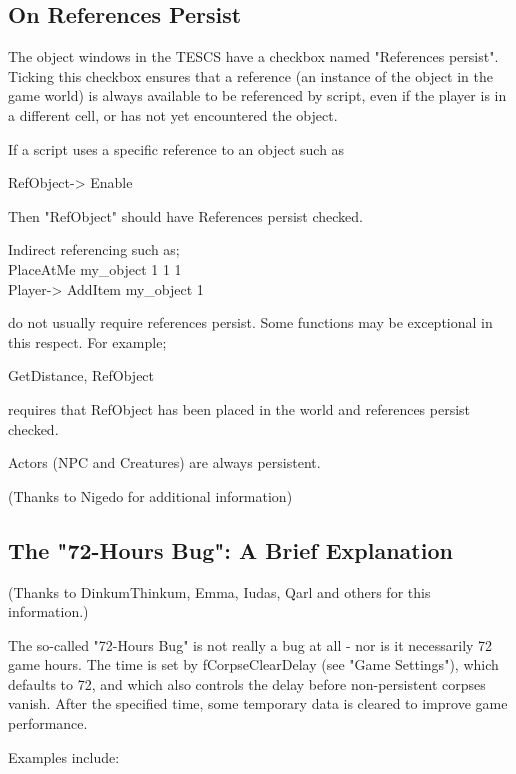 \hypertarget{on-references-persist}{%
\subsection{\texorpdfstring{\hfill\break
On References
Persist}{ On References Persist}}\label{on-references-persist}}

The object windows in the TESCS have a checkbox named "References
persist". Ticking this checkbox ensures that a reference (an instance of
the object in the game world) is always available to be referenced by
script, even if the player is in a different cell, or has not yet
encountered the object.

If a script uses a specific reference to an object such as

RefObject-> Enable

Then "RefObject" should have References persist checked.

Indirect referencing such as;\\
PlaceAtMe my\_object 1 1 1\\
Player-> AddItem my\_object 1

do not usually require references persist. Some functions may be
exceptional in this respect. For example;

GetDistance, RefObject

requires that RefObject has been placed in the world and references
persist checked.

Actors (NPC and Creatures) are always persistent.

(Thanks to Nigedo for additional information)

\hypertarget{the-72-hours-bug-a-brief-explanation}{%
\subsection{The "72-Hours Bug": A Brief
Explanation}\label{the-72-hours-bug-a-brief-explanation}}

(Thanks to DinkumThinkum, Emma, Iudas, Qarl and others for this
information.)

The so-called "72-Hours Bug" is not really a bug at all - nor is it
necessarily 72 game hours. The time is set by fCorpseClearDelay (see
"Game Settings"), which defaults to 72, and which also controls the
delay before non-persistent corpses vanish. After the specified time,
some temporary data is cleared to improve game performance.

Examples include:

